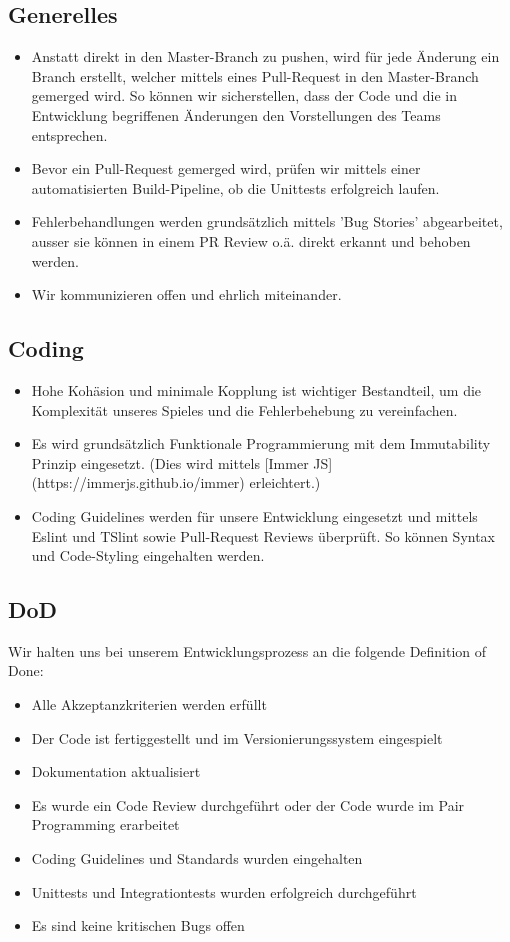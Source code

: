 \documentclass[a4paper, 11pt]{scrartcl}
\begin{document}
\subsection{Generelles}
\begin{itemize}
  \item Anstatt direkt in den Master-Branch zu pushen, wird für jede Änderung ein Branch erstellt, welcher mittels eines Pull-Request in den Master-Branch gemerged wird.
        So können wir sicherstellen, dass der Code und die in Entwicklung begriffenen Änderungen den Vorstellungen des Teams entsprechen.
  \item Bevor ein Pull-Request gemerged wird, prüfen wir mittels einer automatisierten Build-Pipeline, ob die Unittests erfolgreich laufen.
  \item Fehlerbehandlungen werden grundsätzlich mittels 'Bug Stories' abgearbeitet, ausser sie können in einem PR Review o.ä. direkt erkannt und behoben werden.
  \item Wir kommunizieren offen und ehrlich miteinander.
\end{itemize}

\subsection{Coding}
\begin{itemize}
  \item Hohe Kohäsion und minimale Kopplung ist wichtiger Bestandteil, um die Komplexität unseres Spieles und die Fehlerbehebung zu vereinfachen.
  \item Es wird grundsätzlich Funktionale Programmierung mit dem Immutability Prinzip eingesetzt. (Dies wird mittels [Immer JS](https://immerjs.github.io/immer) erleichtert.)
  \item Coding Guidelines werden für unsere Entwicklung eingesetzt und mittels Eslint und TSlint sowie Pull-Request Reviews überprüft. So können Syntax und Code-Styling eingehalten werden.
\end{itemize}

\subsection{DoD}
Wir halten uns bei unserem Entwicklungsprozess an die folgende Definition of Done:
\begin{itemize}
  \item Alle Akzeptanzkriterien werden erfüllt
  \item Der Code ist fertiggestellt und im Versionierungssystem eingespielt
  \item Dokumentation aktualisiert
  \item Es wurde ein Code Review durchgeführt oder der Code wurde im Pair Programming erarbeitet
  \item Coding Guidelines und Standards wurden eingehalten
  \item Unittests und Integrationtests wurden erfolgreich durchgeführt
  \item Es sind keine kritischen Bugs offen
\end{itemize}
\end{document}
